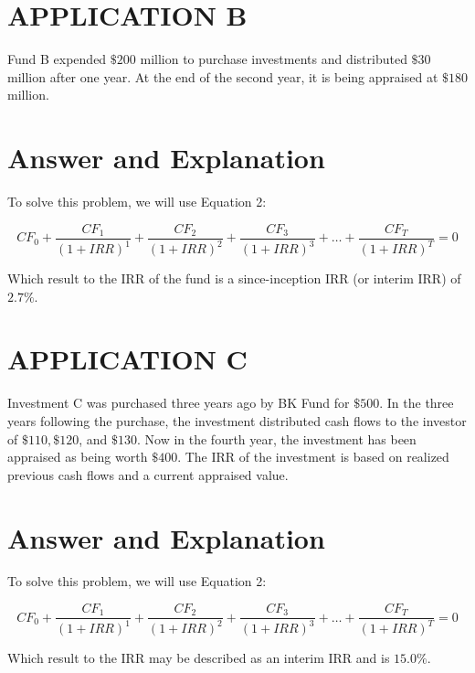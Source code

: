 \documentclass[11pt]{article}
\begin{document}
\section*{APPLICATION B}
Fund B expended $\$ 200$ million to purchase investments and distributed $\$ 30$ million after one year. At the end of the second year, it is being appraised at $\$ 180$ million.

\section*{Answer and Explanation}
To solve this problem, we will use Equation 2:

$$
C F_{0}+\frac{C F_{1}}{(1+I R R)^{1}}+\frac{C F_{2}}{(1+I R R)^{2}}+\frac{C F_{3}}{(1+I R R)^{3}}+\ldots+\frac{C F_{T}}{(1+I R R)^{T}}=0
$$

Which result to the IRR of the fund is a since-inception IRR (or interim IRR) of $2.7 \%$.

\section*{APPLICATION C}
Investment $\mathrm{C}$ was purchased three years ago by BK Fund for $\$ 500$. In the three years following the purchase, the investment distributed cash flows to the investor of $\$ 110, \$ 120$, and $\$ 130$. Now in the fourth year, the investment has been appraised as being worth $\$ 400$. The IRR of the investment is based on realized previous cash flows and a current appraised value.

\section*{Answer and Explanation}
To solve this problem, we will use Equation 2:

$$
C F_{0}+\frac{C F_{1}}{(1+I R R)^{1}}+\frac{C F_{2}}{(1+I R R)^{2}}+\frac{C F_{3}}{(1+I R R)^{3}}+\ldots+\frac{C F_{T}}{(1+I R R)^{T}}=0
$$

Which result to the IRR may be described as an interim IRR and is $15.0 \%$.
\end{document}
